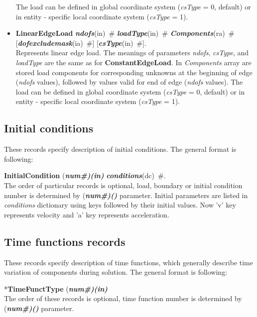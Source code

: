\documentclass[draft]{article}
\newcommand{\param}[1]{{\em #1}}
\newcommand{\fieldVal}[2]{\mbox{({\it\bf{#1}\#)\tiny (#2)}}}
\newcommand{\keywordnotype}[1]{\mbox{{\it{\bf{#1}}}}}
\newcommand{\keyword}[2]{\mbox{{\keywordnotype{#1}\tiny (#2)}}}
\newcommand{\entKeyword}[1]{\mbox{{*{\bf{#1}}}}}
\newcommand{\entKeywordInst}[1]{\mbox{{\bf{{#1}}}}}
\newcommand{\field}[2]{\mbox{\keyword{#1}{#2}~\#}}
\newcommand{\optField}[2]{\mbox{[\field{#1}{#2}]}}
\begin{document}
\begin{itemize}
The load can be defined in global coordinate system (\param{csType} =
0, default) or in entity - specific local coordinate system
(\param{csType} = 1).
\item \entKeywordInst{LinearEdgeLoad} \field{ndofs}{in} \field{loadType}{in}
\field{Components}{ra}\\ \optField{dofexcludemask}{ia} \optField{csType}{in}.\\
Represents linear edge load. The meanings of parameters \param{ndofs},
\param{csType}, and \param{loadType} are the same as for
\entKeywordInst{ConstantEdgeLoad}. In \param{Components}
array are stored load components for corresponding unknowns at the
beginning of edge (\param{ndofs} values), followed by values valid for
end of edge (\param{ndofs} values). The load can be defined in global coordinate system (\param{csType} =
0, default) or in entity - specific local coordinate system
(\param{csType} = 1).
\end{itemize}


\subsection{Initial conditions}
\label{_InitialConditions}
These records specify description of initial conditions. The general format is
following:

\entKeywordInst{InitialCondition} \fieldVal{num}{in}
\field{conditions}{dc}.\\

The order of particular  records is optional, load, boundary or initial condition number is determined by \fieldVal{num}{} parameter.
Initial parameters are listed in \param{conditions} dictionary using keys followed by their initial values.
Now 'v' key represents velocity and 'a' key represents acceleration.



\subsection{Time functions records}
\label{_TimeFunctionsRecords}
These records specify description of time functions, which generally describe
time variation of components during solution. The  general format is
following:

\entKeyword{TimeFunctType} \fieldVal{num}{in}\\

The order of these records is optional, time function number is determined by \fieldVal{num}{} parameter.
\end{document}
